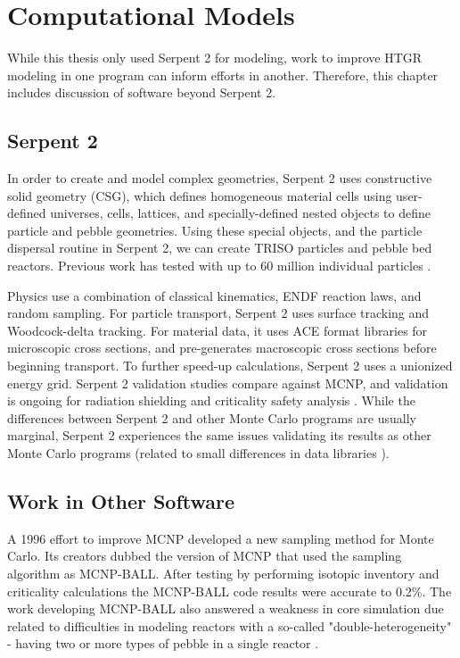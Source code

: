 
\section{Computational Models}

While this thesis only used Serpent 2 \cite{leppanenjaakko_serpent_2015} for modeling, work to improve HTGR modeling in one program can inform efforts in another.  Therefore, this chapter includes discussion of software beyond Serpent 2.

\subsection{Serpent 2}

In order to create and model complex geometries, Serpent 2 uses constructive solid geometry (CSG), which defines homogeneous material cells using user-defined universes, cells, lattices, and specially-defined nested objects to define particle and pebble geometries.  Using these special objects, and the particle dispersal routine in Serpent 2, we can create TRISO particles and pebble bed reactors.  Previous work has tested with up to 60 million individual particles \cite{noauthor_serpent_nodate}.

Physics use a combination of classical kinematics, ENDF reaction laws, and random sampling.  For particle transport, Serpent 2 uses surface tracking and Woodcock-delta tracking.  For material data, it uses ACE format libraries for microscopic cross sections, and pre-generates macroscopic cross sections before beginning transport.  To further speed-up calculations, Serpent 2 uses a unionized energy grid.  Serpent 2 validation studies compare against MCNP, and validation is ongoing for radiation shielding and criticality safety analysis \cite{noauthor_serpent_nodate}.  While the differences between Serpent 2 and other Monte Carlo programs are usually marginal, Serpent 2 experiences the same issues validating its results as other Monte Carlo programs (related to small differences in data libraries \cite{noauthor_serpent_nodate}).

\subsection{Work in Other Software}

A 1996 effort to improve MCNP developed a new sampling method for Monte Carlo.  Its creators dubbed the version of MCNP that used the sampling algorithm as MCNP-BALL.  After testing by performing isotopic inventory and criticality calculations the MCNP-BALL code results were accurate to 0.2\%.  The work developing MCNP-BALL also answered a weakness in core simulation due related to difficulties in modeling reactors with a so-called "double-heterogeneity" - having two or more types of pebble in a single reactor \cite{murata_new_1997}.

